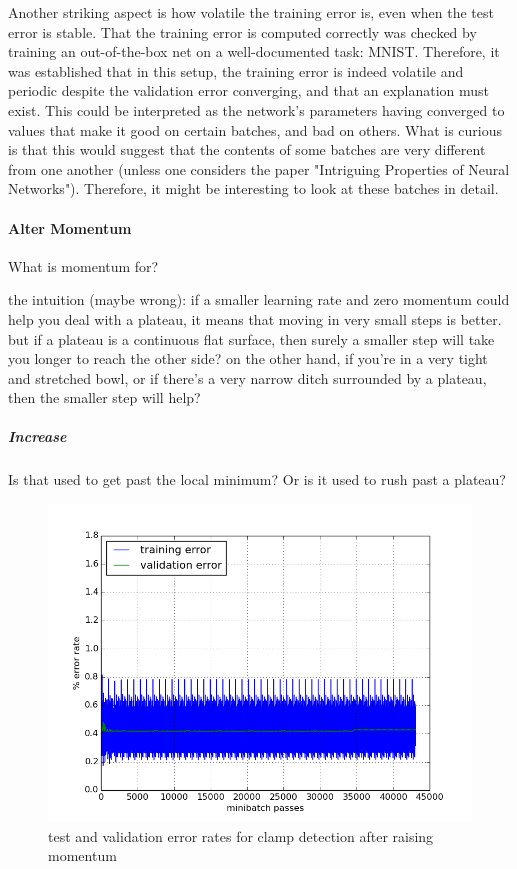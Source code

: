 \documentclass[a4paper,11pt]{article}
\begin{document}
Another striking aspect is how volatile the training error is, even when the test error is stable. That the training error is computed correctly was checked by training an out-of-the-box net on a well-documented task: MNIST. Therefore, it was established that in this setup, the training error is indeed volatile and periodic despite the validation error converging, and that an explanation must exist. This could be interpreted as the network's parameters having converged to values that make it good on certain batches, and bad on others. What is curious is that this would suggest that the contents of some batches are very different from one another (unless one considers the paper "Intriguing Properties of Neural Networks"). Therefore, it might be interesting to look at these batches in detail. \\

\paragraph{Alter Momentum}

What is momentum for?

the intuition (maybe wrong): if a smaller learning rate and zero momentum could help you deal with a plateau, it means that moving in very small steps is better. but if a plateau is a continuous flat surface, then surely a smaller step will take you longer to reach the other side? 
on the other hand, if you're in a very tight and stretched bowl, or if there's a very narrow ditch surrounded by a plateau, then the smaller step will help?﻿

\subparagraph{Increase}

Is that used to get past the local minimum? Or is it used to rush past a plateau?

\begin{figure}[h!]
	\centering
	\includegraphics[scale=0.5]{images/raise_momentum.png}
	\caption{test and validation error rates for clamp detection after raising momentum}
\end{figure}
\end{document}
